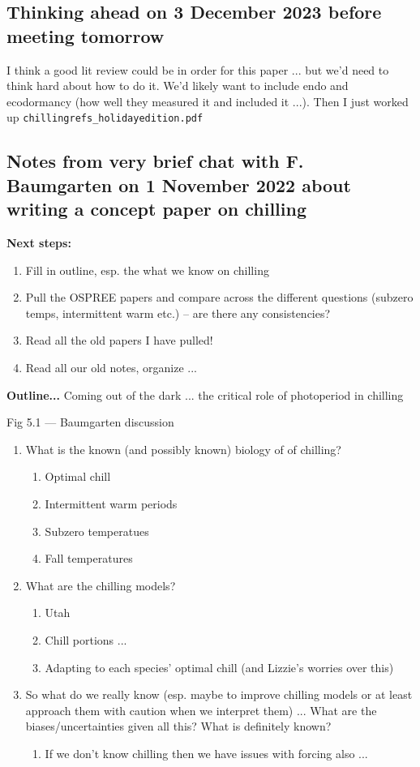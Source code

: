 \documentclass[11pt,letter]{article}
\begin{document}
\subsection{Thinking ahead on 3 December 2023 before meeting tomorrow}

I think a good lit review could be in order for this paper ... but we'd need to think hard about how to do it. We'd likely want to include endo and ecodormancy (how well they measured it and included it ...). Then I just worked up  \verb|chillingrefs_holidayedition.pdf|

\subsection{Notes from very brief chat with F. Baumgarten on 1 November 2022 about writing a concept paper on chilling}

{\bf Next steps:}
\begin{enumerate}
\item Fill in outline, esp. the what we know on chilling
\item Pull the OSPREE papers and compare across the different questions (subzero temps, intermittent warm etc.) -- are there any consistencies?
\item Read all the old papers I have pulled!
\item Read all our old notes, organize ... 
\end{enumerate}

{\bf \Large Outline...} Coming out of the dark ...  the critical role of photoperiod in chilling

Fig 5.1 — Baumgarten discussion 

\begin{enumerate}
\item What is the known (and possibly known) biology of of chilling?
\begin{enumerate}
\item Optimal chill
\item Intermittent warm periods
\item Subzero temperatues
\item Fall temperatures
\end{enumerate}
\item What are the chilling models?
\begin{enumerate}
\item Utah 
\item Chill portions ...
\item Adapting to each species' optimal chill (and Lizzie's worries over this)
\end{enumerate}
\item So what do we really know (esp. maybe to improve chilling models or at least approach them with caution when we interpret them) ... What are the biases/uncertainties given all this? What is definitely known?
\begin{enumerate}
\item If we don't know chilling then we have issues with forcing also ... 
\end{enumerate}
\end{enumerate}
\end{document}
